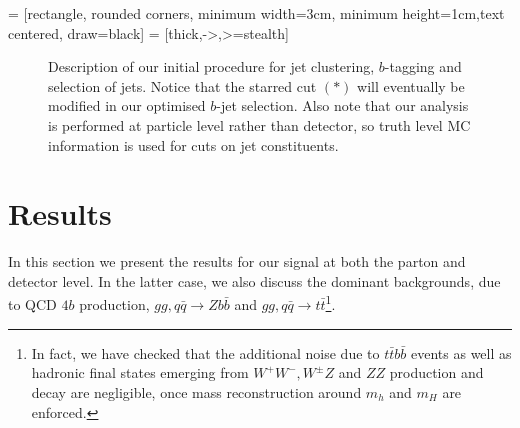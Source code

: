\documentclass[12pt]{article}
\begin{document}
\vspace*{1em}
 = [rectangle, rounded corners, minimum width=3cm, minimum height=1cm,text centered, draw=black]
 = [thick,->,>=stealth]

\begin{figure}[!t]
\centering
\hspace*{-1.05truecm}
\caption{Description of our initial procedure for jet clustering, $b$-tagging and selection of jets. Notice that the starred cut $(*)$ will eventually be modified in our optimised $b$-jet selection. Also note that our analysis is performed at particle level rather than detector, so truth level MC information is used for cuts on jet constituents.}
\label{fig:cutflow}
\end{figure}
\section{Results}
In this section we present the results for our signal at both the parton and detector level. In the latter case, we also discuss the dominant backgrounds, due to QCD $4b$ production, $gg,q\bar q\to Zb\bar b$ and $gg,q\bar q\to t\bar t$\footnote{In fact, we have checked that the additional noise due to
$t\bar t b\bar b$ events as well as hadronic final states emerging from $W^+W^-, W^\pm Z$ and $ZZ$ production and decay are negligible, once mass reconstruction around $m_h$ and $m_H$ are enforced.}.
\end{document}
